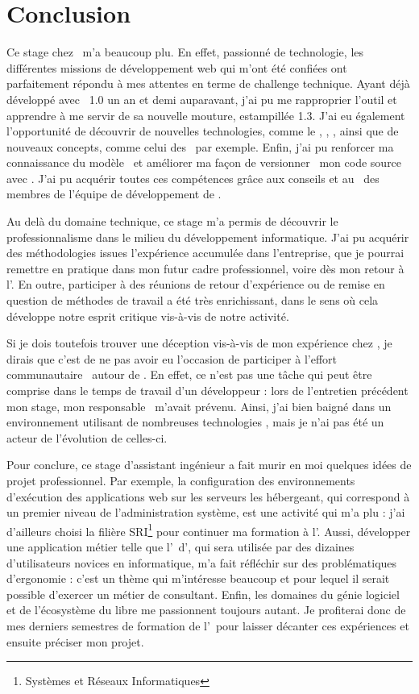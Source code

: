 \chapter{Conclusion}

Ce stage chez \asl\ m'a beaucoup plu. En effet, passionné de technologie, les différentes missions de développement web qui m'ont été confiées ont parfaitement répondu à mes attentes en terme de challenge technique. Ayant déjà développé avec \asf~1.0 un an et demi auparavant, j'ai pu me rapproprier l'outil et apprendre à me servir de sa nouvelle mouture, estampillée 1.3. J'ai eu également l'opportunité de découvrir de nouvelles technologies, comme le \ajs, \ajquery, \aajax, ainsi que de nouveaux concepts, comme celui des \awss\ par exemple. Enfin, j'ai pu renforcer ma connaissance du modèle \amvc\ et améliorer ma façon de \og versionner \fg\ mon code source avec \asvn. J'ai pu acquérir toutes ces compétences grâce aux conseils et au \acoaching\ des membres de l'équipe de développement de \asl.

Au delà du domaine technique, ce stage m'a permis de découvrir le professionnalisme dans le milieu du développement informatique. J'ai pu acquérir des méthodologies issues l'expérience accumulée dans l'entreprise, que je pourrai remettre en pratique dans mon futur cadre professionnel, voire dès mon retour à l'\autc. En outre, participer à des réunions de retour d'expérience ou de remise en question de méthodes de travail a été très enrichissant, dans le sens où cela développe notre esprit critique vis-à-vis de notre activité.

Si je dois toutefois trouver une déception vis-à-vis de mon expérience chez \asl, je dirais que c'est de ne pas avoir eu l'occasion de participer à l'effort communautaire \aos\ autour de \asf. En effet, ce n'est pas une tâche qui peut être comprise dans le temps de travail d'un développeur : lors de l'entretien précédent mon stage, mon responsable \ahugon\ m'avait prévenu. Ainsi, j'ai bien baigné dans un environnement utilisant de nombreuses technologies \aos, mais je n'ai pas été un acteur de l'évolution de celles-ci.

Pour conclure, ce stage d'assistant ingénieur a fait murir en moi quelques idées de projet professionnel. Par exemple, la configuration des environnements d'exécution des applications web sur les serveurs les hébergeant, qui correspond à un premier niveau de l'administration système, est une activité qui m'a plu : j'ai d'ailleurs choisi la filière SRI\footnote{Systèmes et Réseaux Informatiques} pour continuer ma formation à l'\autc. Aussi, développer une application métier telle que l'\aintranet\ d'\aey, qui sera utilisée par des dizaines d'utilisateurs novices en informatique, m'a fait réfléchir sur des problématiques d'ergonomie : c'est un thème qui m'intéresse beaucoup et pour lequel il serait possible d'exercer un métier de consultant. Enfin, les domaines du génie logiciel et de l'écosystème du libre me passionnent toujours autant. Je profiterai donc de mes derniers semestres de formation de l'\autc\ pour laisser décanter ces expériences et ensuite préciser mon projet.
